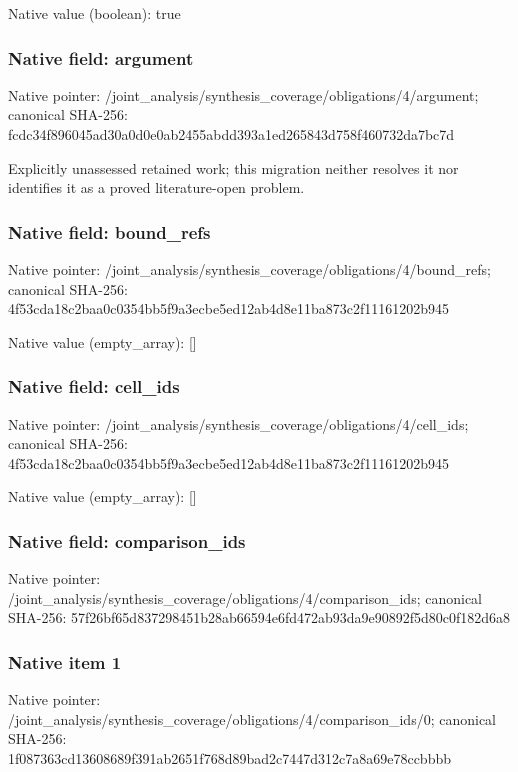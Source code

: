 \documentclass[10pt,a4paper]{article}
\begin{document}
Native value (boolean): true

\subsubsection{Native field: argument}
Native pointer: /joint\_\allowbreak{}analysis/synthesis\_\allowbreak{}coverage/obligations/4/argument; canonical SHA-256: fcdc34f896045ad30a0d0e0ab2455abdd393a1ed265843d758f460732da7bc7d

\begingroup\raggedright\sloppy Explicitly unassessed retained work;\allowbreak{} this migration neither resolves it nor identifies it as a proved literature-open problem.\par\endgroup

\subsubsection{Native field: bound\_\allowbreak{}refs}
Native pointer: /joint\_\allowbreak{}analysis/synthesis\_\allowbreak{}coverage/obligations/4/bound\_\allowbreak{}refs; canonical SHA-256: 4f53cda18c2baa0c0354bb5f9a3ecbe5ed12ab4d8e11ba873c2f11161202b945

Native value (empty\_\allowbreak{}array): []

\subsubsection{Native field: cell\_\allowbreak{}ids}
Native pointer: /joint\_\allowbreak{}analysis/synthesis\_\allowbreak{}coverage/obligations/4/cell\_\allowbreak{}ids; canonical SHA-256: 4f53cda18c2baa0c0354bb5f9a3ecbe5ed12ab4d8e11ba873c2f11161202b945

Native value (empty\_\allowbreak{}array): []

\subsubsection{Native field: comparison\_\allowbreak{}ids}
Native pointer: /joint\_\allowbreak{}analysis/synthesis\_\allowbreak{}coverage/obligations/4/comparison\_\allowbreak{}ids; canonical SHA-256: 57f26bf65d837298451b28ab66594e6fd472ab93da9e90892f5d80c0f182d6a8

\subsubsection{Native item 1}
Native pointer: /joint\_\allowbreak{}analysis/synthesis\_\allowbreak{}coverage/obligations/4/comparison\_\allowbreak{}ids/0; canonical SHA-256: 1f087363cd13608689f391ab2651f768d89bad2c7447d312c7a8a69e78ccbbbb
\end{document}
